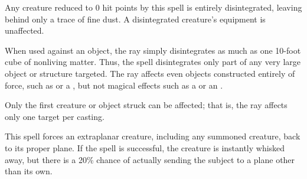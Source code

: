 \spellrng{\rngclose}
\begin{spelleffect}
  Any creature reduced to 0 hit points by this spell is entirely disintegrated, leaving behind only a trace of fine dust. A disintegrated creature's equipment is unaffected.
  \par When used against an object, the ray simply disintegrates as much as one 10-foot cube of nonliving matter. Thus, the spell disintegrates only part of any very large object or structure targeted. The ray affects even objects constructed entirely of force, such as  or a , but not magical effects such as a  or an .
\end{spelleffect}
\begin{spellnotes}
  Only the first creature or object struck can be affected; that is, the ray affects only one target per casting.
\end{spellnotes}

\spellrng{\rngclose}
\begin{spelleffect}
  This spell forces an extraplanar creature, including any summoned creature, back to its proper plane. If the spell is successful, the creature is instantly whisked away, but there is a 20\% chance of actually sending the subject to a plane other than its own.
\end{spelleffect}


